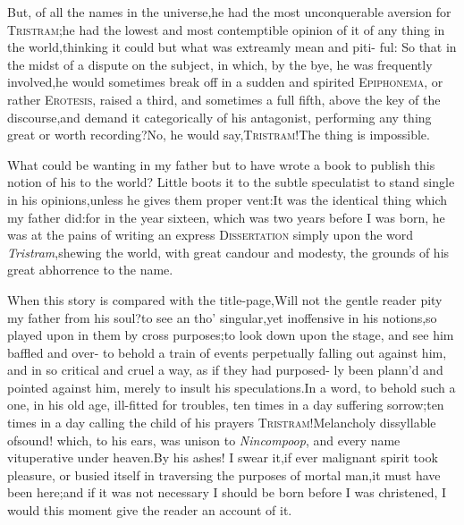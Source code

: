 \documentclass{article}
\begin{document}
But, of all the names in the universe,\break he had the most unconquerable aversion for
\textsc{Tristram};\tsk  he had the lowest and most contemptible opinion
of it of any thing in the world,\tsk  thinking it
could  but what was extreamly mean and piti-
ful: So
that in the midst of a dispute on the subject, in which, by the bye, he was
frequently involved,\tsh  he would sometimes break off in a sudden and
spirited \textsc{Epiphonema}, or rather \textsc{Erotesis}, raised a
third, and sometimes a full fifth, above the key of the
discourse,\tsh  and demand it categorically of his antagonist,
performing any thing great or worth
re\-cording?\tsk  No\tsk, he would
say,\tsk  \textsc{Tri\-stram}!\tsk  The thing is impossible.

What could be wanting in my father but to have wrote a book to
publish this notion of his to the world? Little boots it to the
subtle speculatist to stand single in his opinions,\tsk  unless he
gives them proper vent:\tsk  It was the identical thing which my
father did:\tsk  for in the year sixteen, which was two years
before I was born, he was at the pains of writing an express
\textsc{Dissertation} simply upon the word
\textit{Tristram},\tsk  shewing the world, with great candour and
modesty, the grounds of his great abhorrence to the name.

When this story is compared with the title-page,\tsk  Will not
the gentle reader pity my father from his soul?\tsk  to see an\break
{}\break
tho’ singular,\tsk  yet inoffensive in his no\-tions,\tsk  so played
upon in them by cross purposes;\tsh  to look down upon
the stage, and see him baffled and over-\break
{}
to behold a train of events perpetually
falling out against him, and in so critical and cruel a way, as if
they had purposed- ly been plann’d and pointed ag\-ainst him,
merely to insult his speculations.\tsh  In a word, to
behold such a one, in his old age, ill-fitted for troubles, ten
times in a day suffering sorrow;\tsk  ten times in a day calling
the child of his prayers \textsc{Tristram}!\tsk  Melancholy
dissyllable of\break sound! which, to his ears, was unison to
\textit{Nincompoop}, and every name vituperative under
heaven.\tsh  By his ashes! I swear it,\tsk  if ever
malignant spirit took pleasure, or busied itself in traversing the
purposes of mortal man,\tsk  it must have been here;\tsk  and if
it was not necessary I should be born before I was christened, I
would this moment give the reader an account of it.
\end{document}
